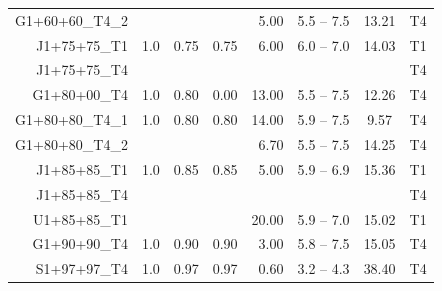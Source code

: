 \begin{table}
\begin{tabular}{@{}rrrcrrcc}
\\   %
G1+60+60\_T4\_2 &      &        &        &   5.00  &   5.5 -- 7.5  &  13.21  &  
T4 \\ %
J1+75+75\_T1 & 1.0  &  0.75  &  0.75  &  6.00  &   6.0 -- 7.0  &  14.03  & T1\\
J1+75+75\_T4 & & & & & & & T4 \\
G1+80+00\_T4 & 1.0  &  0.80  &  0.00  &  13.00  &   5.5 -- 7.5  &  12.26  &  T4 
\\ %
G1+80+80\_T4\_1 & 1.0  &  0.80  &  0.80  & 14.00  &   5.9 -- 7.5  &  9.57  &  T4 
\\ %
G1+80+80\_T4\_2 &      &        &        &  6.70  &   5.5 -- 7.5  & 14.25  &  T4 
\\
J1+85+85\_T1 & 1.0  &  0.85  &  0.85  &  5.00  &   5.9 -- 6.9  &  15.36  & T1\\
J1+85+85\_T4 & & & & & & & T4 \\
U1+85+85\_T1 &   &    &    &  20.00  &  5.9 -- 7.0  &  15.02  &  T1 \\
G1+90+90\_T4 & 1.0  &  0.90  &  0.90  &  3.00  &   5.8 -- 7.5  &  15.05  &  T4 
\\
S1+97+97\_T4 & 1.0  &  0.97  &  0.97  &  0.60  &   3.2 -- 4.3  &  38.40  &  T4 
\\
      \hline
    \end{tabular}
\end{table}



